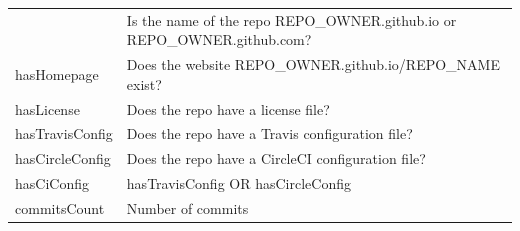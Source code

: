 \documentclass{article}
\begin{document}
\begin{longtable}[]{@{}ll@{}}
\begin{minipage}[t]{0.17\columnwidth}
\end{minipage} & \begin{minipage}[t]{0.16\columnwidth}\raggedright\strut
Is the name of the repo REPO\_OWNER.github.io or
REPO\_OWNER.github.com?\strut
\end{minipage}\tabularnewline
\begin{minipage}[t]{0.17\columnwidth}\raggedright\strut
hasHomepage\strut
\end{minipage} & \begin{minipage}[t]{0.16\columnwidth}\raggedright\strut
Does the website REPO\_OWNER.github.io/REPO\_NAME exist?\strut
\end{minipage}\tabularnewline
\begin{minipage}[t]{0.17\columnwidth}\raggedright\strut
hasLicense\strut
\end{minipage} & \begin{minipage}[t]{0.16\columnwidth}\raggedright\strut
Does the repo have a license file?\strut
\end{minipage}\tabularnewline
\begin{minipage}[t]{0.17\columnwidth}\raggedright\strut
hasTravisConfig\strut
\end{minipage} & \begin{minipage}[t]{0.16\columnwidth}\raggedright\strut
Does the repo have a Travis configuration file?\strut
\end{minipage}\tabularnewline
\begin{minipage}[t]{0.17\columnwidth}\raggedright\strut
hasCircleConfig\strut
\end{minipage} & \begin{minipage}[t]{0.16\columnwidth}\raggedright\strut
Does the repo have a CircleCI configuration file?\strut
\end{minipage}\tabularnewline
\begin{minipage}[t]{0.17\columnwidth}\raggedright\strut
hasCiConfig\strut
\end{minipage} & \begin{minipage}[t]{0.16\columnwidth}\raggedright\strut
hasTravisConfig OR hasCircleConfig\strut
\end{minipage}\tabularnewline
\begin{minipage}[t]{0.17\columnwidth}\raggedright\strut
commitsCount\strut
\end{minipage} & \begin{minipage}[t]{0.16\columnwidth}\raggedright\strut
Number of commits\strut
\end{minipage}\tabularnewline

\end{longtable}
\end{document}
